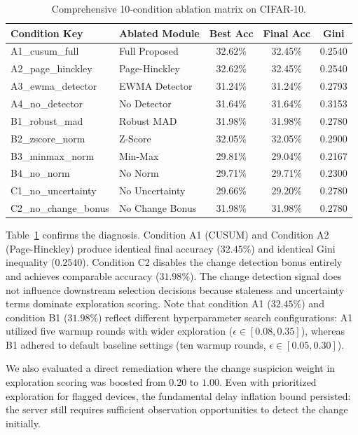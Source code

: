 \documentclass[conference]{IEEEtran}
\begin{document}
\begin{table}[h]
\centering
\caption{Comprehensive 10-condition ablation matrix on CIFAR-10.}
\label{tab:ablation_results}
\begin{tabular}{llccc}
\toprule
Condition Key & Ablated Module & Best Acc & Final Acc & Gini \\
\midrule
A1\_cusum\_full & Full Proposed & 32.62\% & 32.45\% & 0.2540 \\
A2\_page\_hinckley & Page-Hinckley & 32.62\% & 32.45\% & 0.2540 \\
A3\_ewma\_detector & EWMA Detector & 31.24\% & 31.24\% & 0.2793 \\
A4\_no\_detector & No Detector & 31.64\% & 31.64\% & 0.3153 \\
B1\_robust\_mad & Robust MAD & 31.98\% & 31.98\% & 0.2780 \\
B2\_zscore\_norm & Z-Score & 32.05\% & 32.05\% & 0.2900 \\
B3\_minmax\_norm & Min-Max & 29.81\% & 29.04\% & 0.2167 \\
B4\_no\_norm & No Norm & 29.71\% & 29.71\% & 0.2300 \\
C1\_no\_uncertainty & No Uncertainty & 29.66\% & 29.20\% & 0.2780 \\
C2\_no\_change\_bonus & No Change Bonus & 31.98\% & 31.98\% & 0.2780 \\
\bottomrule
\end{tabular}
\end{table}

Table~\ref{tab:ablation_results} confirms the diagnosis. Condition A1 (CUSUM) and Condition A2 (Page-Hinckley) produce identical final accuracy ($32.45\%$) and identical Gini inequality ($0.2540$). Condition C2 disables the change detection bonus entirely and achieves comparable accuracy ($31.98\%$). The change detection signal does not influence downstream selection decisions because staleness and uncertainty terms dominate exploration scoring. Note that condition A1 ($32.45\%$) and condition B1 ($31.98\%$) reflect different hyperparameter search configurations: A1 utilized five warmup rounds with wider exploration ($\epsilon \in [0.08, 0.35]$), whereas B1 adhered to default baseline settings (ten warmup rounds, $\epsilon \in [0.05, 0.30]$).

We also evaluated a direct remediation where the change suspicion weight in exploration scoring was boosted from $0.20$ to $1.00$. Even with prioritized exploration for flagged devices, the fundamental delay inflation bound persisted: the server still requires sufficient observation opportunities to detect the change initially.
\end{document}
